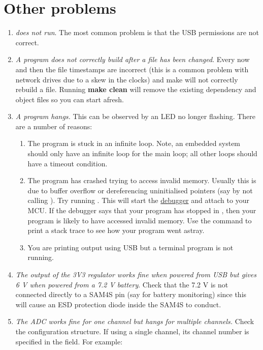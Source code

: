 \section{Other problems}
\label{faq}

\begin{enumerate}
\item
  \emph{ does not run}. The most common problem is that the
  USB permissions are not correct.
\item
  \emph{A program does not correctly build after a file has been
  changed}. Every now and then the file timestamps are incorrect (this
  is a common problem with network drives due to a skew in the clocks)
  and make will not correctly rebuild a file. Running \textbf{make
  clean} will remove the existing dependency and object files so you can
  start afresh.
\item
  \emph{A program hangs.} This can be observed by an LED no longer
  flashing. There are a number of reasons:

  \begin{enumerate}
  \item
    The program is stuck in an infinite loop. Note, an embedded system
    should only have an infinite loop for the main loop; all other loops
    should have a timeout condition.
  \item
    The program has crashed trying to access invalid memory. Usually
    this is due to buffer overflow or dereferencing uninitialised
    pointers (say by not calling ). Try running
    .  This will start the
    \protect\hyperref[debugging]{debugger} and attach to your MCU. If
    the debugger says that your program has stopped in
    , then your program is likely to have
    accessed invalid memory. Use the  command to print a
    stack trace to see how your program went astray.
  \item You are printing output using USB but a terminal program is
    not running.
  \end{enumerate}
\item
  \emph{The output of the 3V3 regulator works fine when powered from USB
  but gives 6 V when powered from a 7.2 V battery}. Check that the 7.2 V
  is not connected directly to a SAM4S pin (say for battery monitoring)
  since this will cause an ESD protection diode inside the SAM4S to
  conduct.
\item
  \emph{The ADC works fine for one channel but hangs for multiple
    channels.}  Check the configuration structure.  If using a single
  channel, its channel number is specified in the 
  field.  For example:


\end{enumerate}
